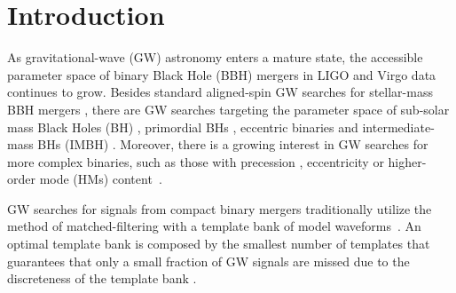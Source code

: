 \documentclass[twocolumn,showpacs,preprintnumbers,nofootinbib,prd,
superscriptaddress,10pt]{revtex4-2}
\begin{document}
	\author{Sarah }
	\maketitle
\section{Introduction}

As gravitational-wave (GW) astronomy enters a mature state, the accessible parameter space of binary Black Hole (BBH) mergers in LIGO \cite{LIGOScientific:2014pky} and Virgo \cite{VIRGO:2014yos} data continues to grow. Besides standard aligned-spin GW searches for stellar-mass BBH mergers \cite{GWTC-1,GWTC-2,GWTC-2.1, GWTC-3}, there are GW searches targeting the parameter space of sub-solar mass Black Holes (BH) \cite{SSM_O2, SSM_O3a, PhysRevD.106.023024, Nitz:2021mzz}, primordial BHs \cite{PBH}, eccentric binaries \cite{PhysRevD.102.043005, PhysRevD.104.104016, Nitz:2019spj} and intermediate-mass BHs (IMBH) \cite{IMBH_O2, IMBH_O3, Chandra:2022ixv}. Moreover, there is a growing interest in GW searches for more complex binaries, such as those with precession \cite{PhysRevD.89.024010, Harry:2017weg, PhysRevD.102.041302, Indik:2016qky, Harry:2016ijz}, eccentricity \cite{LIGOScientific:2019dag, Ramos-Buades:2020eju, Wang:2021qsu, Nitz:2021mzz} or higher-order mode (HMs) content~\cite{CalderonBustillo:2015lrt, Harry:2017weg, Chandra_hom, 2021PhRvD.103b4042M}.

GW searches for signals from compact binary mergers traditionally utilize the method of matched-filtering with a template bank of model waveforms~\cite{Sathyaprakash:1991mt, Dhurandhar:1992mw, Owen:1998dk, Allen:2005fk, Babak:2006ty, Cokelaer:2007mv}.
An optimal template bank is composed by the smallest number of templates that guarantees that only a small fraction of GW signals are missed due to the discreteness of the template bank \cite{Prix:2007ks}.
\end{document}
